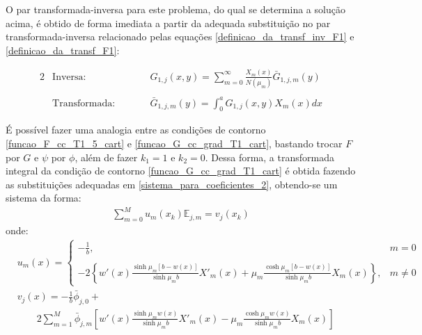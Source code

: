 O par transformada-inversa para este problema, do qual se determina a solução acima, é obtido de forma imediata a partir da adequada substituição no par transformada-inversa relacionado pelas equações \eqref{definicao_da_transf_inv_F1} e \eqref{definicao_da_transf_F1}:
  \begin{fleqn}
  \begin{alignat}{2}
  		& \text{Inversa:} && G_{1, j}(x, y) = \sum_{m=0}^\infty \frac{X_m(x)}{N(\mu_m)}\bar{G}_{1,j,m}(y) \label{definicao_da_transf_inv_G1} \\ \nonumber \\
  		& \text{Transformada:} \quad\quad && \bar{G}_{1,j,m}(y) = \int_0^a G_{1, j}(x, y) X_m(x) dx \label{definicao_da_transf_G1}
  \end{alignat}
  \end{fleqn}
  
É possível fazer uma analogia entre as condições de contorno \eqref{funcao_F_cc_T1_5_cart} e \eqref{funcao_G_cc_grad_T1_cart}, bastando trocar $F$ por $G$ e $\psi$ por $\phi$, além de fazer $k_1 = 1$ e $k_2 = 0$. Dessa forma, a transformada integral da condição de contorno \eqref{funcao_G_cc_grad_T1_cart} é obtida fazendo as substituições adequadas em \eqref{sistema_para_coeficientes_2}, obtendo-se um sistema da forma:
\begin{align}
\sum_{m = 0}^M u_m(x_k) \mathbb{E}_{j,m} = v_{j}(x_k) 
\label{sistema_para_coeficientes_20}
\end{align}
onde:
\begin{align}
& u_m(x) = \left\lbrace
\begin{array}{ll}
\displaystyle -\frac{1}{b}, & m = 0 \\ \\
\displaystyle -2\left\lbrace w'(x)\frac{\sinh\mu_m [b - w(x)]}{\sinh\mu_m b}X'_m(x) +   \mu_m\frac{\cosh\mu_m [b - w(x)]}{\sinh\mu_m b}X_m(x)\right\rbrace, & m \ne 0
\end{array}
\right.  \label{compacta_p2} \\
&
v_{j}(x) = -\frac{1}{b}\bar{\phi}_{j,0} + \nonumber \\
& \quad\quad  2 \sum_{m=1}^M \bar{\phi}_{j, m}\left[ w'(x)\frac{\sinh\mu_m w(x)}{\sinh\mu_m b}X'_m(x) -  \mu_m\frac{\cosh\mu_m w(x)}{\sinh\mu_m b}X_m(x)\right] \label{compacta_r2}
\end{align}

